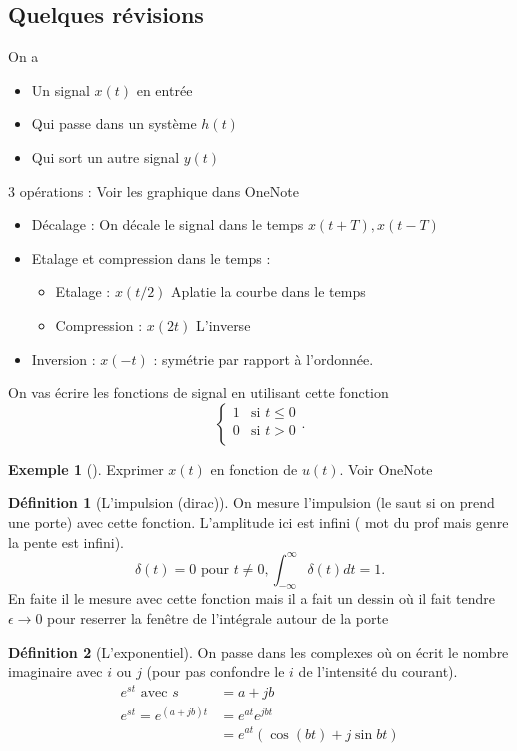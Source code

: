 \documentclass{article}
\theoremstyle{plain}%
\theoremstyle{definition}
\newtheorem{defn}{Définition}[section]
\newtheorem{exmp}{Exemple}[section]
\theoremstyle{remark}
\begin{document}
\subsection{Quelques révisions}
On a \begin{itemize}
    \item Un signal $ x(t) $ en entrée
    \item Qui passe dans un système $ h(t) $ 
    \item Qui sort un autre signal $ y(t) $ 
\end{itemize}
3 opérations : Voir les graphique dans OneNote
\begin{itemize}
    \item Décalage : On décale le signal dans le temps $ x(t+T), x(t-T)$ 
    \item Etalage et compression dans le temps : \begin{itemize}
        \item Etalage : $ x(t/2) $ Aplatie la courbe dans le temps 
        \item Compression : $ x(2t) $ L'inverse
    \end{itemize}
    \item Inversion : $ x(-t) $ : symétrie par rapport à l'ordonnée. 
\end{itemize}

On vas écrire les fonctions de signal en utilisant cette fonction
\[
    \begin{cases}
        1 &\text{si } t \leq 0\\
        0 &\text{si } t > 0\\
    \end{cases} 
.\]
\begin{exmp}[]
    Exprimer $ x(t) $ en fonction de $ u(t) $. Voir OneNote
\end{exmp}

\begin{defn}[L'impulsion (dirac)]
    On mesure l'impulsion (le saut si on prend une porte) avec cette fonction. L'amplitude ici est infini ( mot du prof mais genre la pente est infini). 
    \[
        \delta (t) = 0 \text{ pour } t \neq 0 , \int_{- \infty }^{\infty } \delta (t) dt = 1
    .\]
    En faite il le mesure avec cette fonction mais il a fait un dessin où il fait tendre $ \epsilon \to 0 $ pour reserrer la fenêtre de l'intégrale autour de la porte 
\end{defn}

\begin{defn}[L'exponentiel]
    On passe dans les complexes où on écrit le nombre imaginaire avec $ i $ ou $ j $ (pour pas confondre le $ i $ de l'intensité du courant). \begin{align*}
        e^{st} \text{ avec } s &= a + jb \\
        e^{st} = e^{(a+jb)t} &= e^{at} e^{jbt} \\
                            &= e^{at}(\cos (bt) + j \sin bt)
    \end{align*}
\end{defn}
\end{document}
